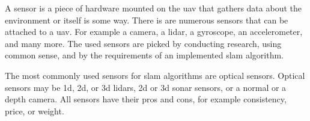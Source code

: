 A sensor is a piece of hardware mounted on the \acs{uav} that gathers data about the environment or itself is some way. There is are numerous sensors that can be attached to a \acs{uav}. For example a camera, a \acs{lidar}, a gyroscope, an accelerometer, and many more. The used sensors are picked by conducting research, using common sense, and by the requirements of an implemented \acs{slam} algorithm.

The most commonly used sensors for \acs{slam} algorithms are optical sensors. Optical sensors may be \acs{1d}, \acs{2d}, or \acs{3d} \acsp{lidar}, \acs{2d} or \acs{3d} sonar sensors, or a normal or a depth camera. All sensors have their pros and cons, for example consistency, price, or weight.